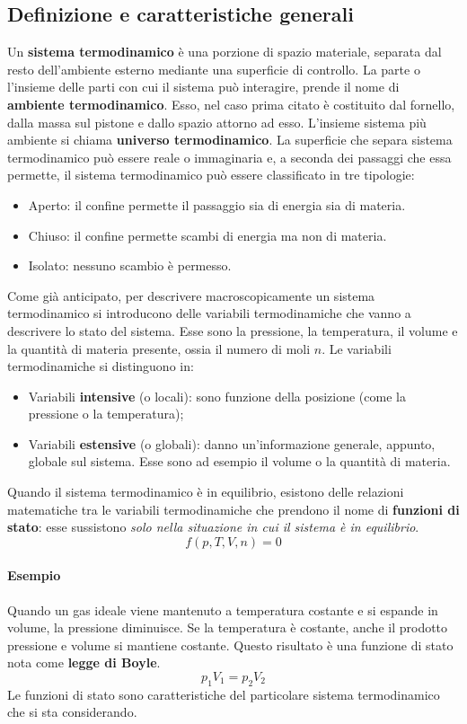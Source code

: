 \documentclass[10pt,a4paper]{book}
\begin{document}
\subsection{Definizione e caratteristiche generali}

Un \textbf{sistema termodinamico} è una porzione di spazio materiale, separata dal resto dell'ambiente esterno mediante una superficie di controllo. La parte o l'insieme delle parti con cui il sistema può interagire, prende il nome di \textbf{ambiente termodinamico}. Esso, nel caso prima citato è costituito dal fornello, dalla massa sul pistone e dallo spazio attorno ad esso. L'insieme sistema più ambiente si chiama \textbf{universo termodinamico}. La superficie che separa sistema termodinamico può essere reale o immaginaria e, a seconda dei passaggi che essa permette, il sistema termodinamico può essere classificato in tre tipologie:
\begin{itemize}
	\item Aperto: il confine permette il passaggio sia di energia sia di materia.
	\item Chiuso: il confine permette scambi di energia ma non di materia.
	\item Isolato: nessuno scambio è permesso.
\end{itemize}
Come già anticipato, per descrivere macroscopicamente un sistema termodinamico si introducono delle variabili termodinamiche che vanno a descrivere lo stato del sistema. Esse sono la pressione, la temperatura, il volume e la quantità di materia presente, ossia il numero di moli $n$.
Le variabili termodinamiche si distinguono in:
\begin{itemize}
	\item Variabili \textbf{intensive} (o locali): sono funzione della posizione (come la pressione o la temperatura);
	\item Variabili \textbf{estensive} (o globali): danno un'informazione generale, appunto, globale sul sistema. Esse sono ad esempio il volume o la quantità di materia.
\end{itemize}
Quando il sistema termodinamico è in equilibrio, esistono delle relazioni matematiche tra le variabili termodinamiche che prendono il nome di \textbf{funzioni di stato}: esse sussistono \emph{solo nella situazione in cui il sistema è in equilibrio}.
\[
	f(p,T,V,n) = 0
\]

\paragraph{Esempio} Quando un gas ideale viene mantenuto a temperatura costante e si espande in volume, la pressione diminuisce. Se la temperatura è costante, anche il prodotto pressione e volume si mantiene costante. Questo risultato è una funzione di stato nota come \textbf{legge di Boyle}.
\[
	p_1 V_1=p_2 V_2
\]
Le funzioni di stato sono caratteristiche del particolare sistema termodinamico che si sta considerando.
\end{document}
